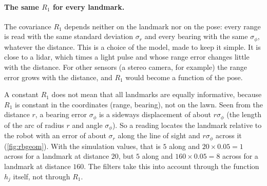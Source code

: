 \paragraph{The same $R_1$ for every landmark.} The covariance $R_1$ depends
neither on the landmark nor on the pose: every range is read with the same
standard deviation $\sigma_r$ and every bearing with the same
$\sigma_\phi$, whatever the distance. This is a choice of the model, made
to keep it simple. It is close to a lidar, which times a light pulse and
whose range error changes little with the distance. For other sensors (a
stereo camera, for example) the range error grows with the distance, and
$R_1$ would become a function of the pose.

A constant $R_1$ does not mean that all landmarks are equally informative,
because $R_1$ is constant in the coordinates (range, bearing), not on the
lawn. Seen from the distance $r$, a bearing error $\sigma_\phi$ is a
sideways displacement of about $r\sigma_\phi$ (the length of the arc of
radius $r$ and angle $\sigma_\phi$). So a reading locates the landmark
relative to the robot with an error of about $\sigma_r$ along the line of
sight and $r\sigma_\phi$ across it (\cref{fig:rbgeom}). With the simulation
values, that is $5$ along and $20\times0.05=1$ across for a landmark at
distance $20$, but $5$ along and $160\times0.05=8$ across for a landmark at
distance $160$. The filters take this into account through the function
$h_j$ itself, not through $R_1$.

